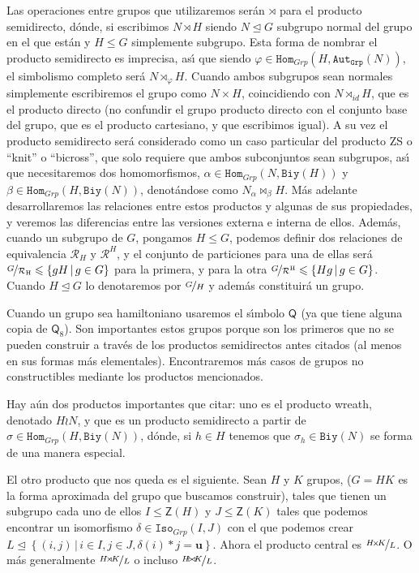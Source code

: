 \documentclass[final,12pt,a4paper,twoside,fleqn]{extbook}
\newcommand{\extset}[2]{\ensuremath{
        \left\lbrace{#1}\,\vert\,{#2}\right\rbrace
}}
\newcommand{\subgreq}{\ensuremath{\leqslant}}
\newcommand{\normsubgreq}{\ensuremath{\trianglelefteq}}
\newcommand{\biy}[1]{\ensuremath{{\mathtt{Biy}}{\left({#1}\right)}}}
\newcommand{\graut}[1]{\ensuremath{{\mathtt{Aut}}_{\mathtt{Grp}}{\left({#1}\right)}}}
\newcommand{\grhom}[2]{\ensuremath{
        {{\mathtt{Hom}}_{Grp}}
        {\left({#1,#2}\right)}
}}
\newcommand{\griso}[2]{\ensuremath{
        {{\mathtt{Iso}}_{Grp}}
        {\left({#1,#2}\right)}
}}
\newcommand{\grcoc}[2]{\ensuremath{
        \nicefrac{#1}{#2}
}}
\newcommand{\grclass}[1]{\ensuremath{\mathsf{#1}}}
\newcommand{\pd}[2]{\ensuremath{{#1}\!          \times          \!{#2}}}
\newcommand{\psd}[2]{\ensuremath{{#1}\!\rtimes\!{#2}}}
\newcommand{\pactsd}[3]{\ensuremath{{#1}\!{\rtimes}_{#3}\!{#2}}}
\newcommand{\pxd}[2]{\ensuremath{{#1}\!\bowtie\!{#2}}}
\newcommand{\pactxd}[4]{\ensuremath{{#1}\! {_{#3\!}}{\bowtie}_{#4}\!{#2}}}
\newcommand{\pwr}[2]{\ensuremath{{#1}\wr{#2}}}
\newcommand{\quaterniongr}[1]{\ensuremath{{\grclass{Q}}_{#1}}}
\newcommand{\centro}[1]{\ensuremath{
        {\mathsf{Z}}
        {\left({#1}\right)}
}}
\newcommand{\neutromult}{\ensuremath{\mathbf{u}}}
\newcommand{\unity}{\ensuremath{\neutromult}}
\theoremstyle{definition}
\theoremstyle{remark}
\begin{document}
Las operaciones entre grupos que utilizaremos ser\'an $\rtimes$
para el producto semidirecto, d\'onde, si escribimos $N\rtimes H$ siendo
$N \normsubgreq G$ subgrupo normal del grupo en el que est\'an y
$H \subgreq G$ simplemente subgrupo. Esta forma de nombrar el
producto semidirecto es imprecisa, as{\'{\i}} que siendo
$\varphi          \in \grhom{H}{\graut{N}}$,
el simbolismo completo ser\'a $\pactsd{N}{H}{\varphi }$. Cuando ambos subgrupos
sean normales simplemente escribiremos el grupo como $\pd{N}{H}$, coincidiendo
con $\pactsd{N}{H}{id}$, que es el producto
directo (no confundir el grupo producto directo con el conjunto
base del grupo, que es el producto cartesiano, y que escribimos igual).
A su vez el producto semidirecto ser\'a considerado como un
caso particular del producto ZS o ``knit'' o ``bicross'', que solo requiere
que ambos subconjuntos
sean subgrupos, as{\'{\i}} que necesitaremos dos homomorfismos,
$\alpha         \in \grhom {N}{\biy{H}}$
y $\beta         \in \grhom {H}{\biy{N}}$, denot\'andose como
$\pactxd {N}{H}{\alpha }{\beta }$. M\'as adelante desarrollaremos las relaciones
entre estos productos
y algunas de sus propiedades, y veremos las diferencias entre las
versiones externa e interna de ellos. Adem\'as, cuando un subgrupo de
$G$, pongamos $H \subgreq G$, podemos definir dos relaciones
de equivalencia $\mathcal{R}_{H}$ y $\mathcal{R}^{H}$, y el conjunto
de particiones para una de ellas ser\'a
$\grcoc{G}{{\mathcal{R}}_{\mathrm{H}}}
\subgreq\extset {gH}{g          \in G}$ para la primera,
y para la otra
$\grcoc{G}{{\mathcal{R}}^{\mathrm{H}}}\subgreq\extset{Hg}{g        \in G}$.
Cuando $H\normsubgreq G$ lo denotaremos por $\grcoc{G}{H}$
y adem\'as constituir\'a un grupo.

Cuando un grupo sea hamiltoniano usaremos el s{\'{\i}}mbolo $\quaterniongr{}$ (ya
que tiene alguna copia de $\quaterniongr{8}$). Son importantes estos grupos porque
son los primeros que no se pueden construir a trav\'es de los productos semidirectos antes citados
(al menos en
sus formas m\'as elementales). Encontraremos m\'as casos de grupos no constructibles
mediante los productos mencionados.

Hay a\'un dos productos importantes que citar: uno es el producto wreath,
denotado $\pwr{H}{N}$, y que es un producto semidirecto a partir de
$\sigma         \in \grhom {H}{\biy{N}}$, d\'onde, si $h         \in H$
tenemos que $\sigma_{h}         \in \biy{N}$
se forma de una manera especial.

El otro producto que nos queda
es el siguiente. Sean $H$ y $K$ grupos, ($G=HK$ es la forma aproximada del grupo que buscamos construir),
tales que tienen un subgrupo cada uno
de ellos $I \subgreq \centro{H}$ y $J \subgreq \centro{K}$
tales que podemos encontrar un isomorfismo $\delta         \in \griso{I}{J}$
con el que podemos crear $L\normsubgreq\extset{(i,j)} {i         \in I,j         \in J,
\delta (i)*j=\unity}$.
Ahora el producto central es $\grcoc{\pd{H}{K}}{L}$. O m\'as generalmente
$\grcoc{\psd{H}{K}}{L}$ o incluso  $\grcoc{\pxd{H}{K}}{L}$.
\end{document}
